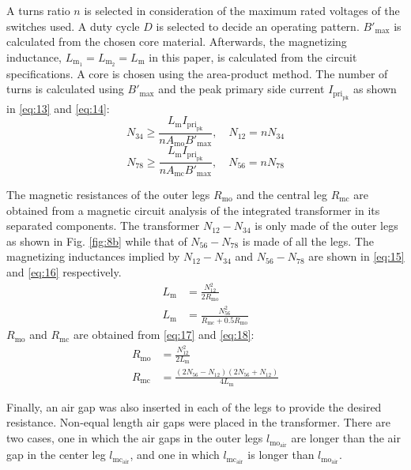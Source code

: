 \documentclass[lettersize,journal]{IEEEtran}
\begin{document}
A turns ratio $n$ is selected in consideration of the maximum rated voltages of the switches used. A duty cycle $D$ is selected to decide an operating pattern. $B'_{\mathrm{max}}$ is calculated from the chosen core material. Afterwards, the magnetizing inductance, $L_{\mathrm{m}_1}=L_{\mathrm{m}_2}=L_{\mathrm{m}}$ in this paper, is calculated from the circuit specifications. A core is chosen using the area-product method. The number of turns is calculated using $B'_{\mathrm{max}}$ and the peak primary side current $I_{\mathrm{pri}_{\mathrm{pk}}}$ as shown in \eqref{eq:13} and \eqref{eq:14}:
\begin{equation}
\label{eq:13}
N_{34} \ge \frac{L_{\mathrm{m}} I_{\mathrm{pri}_{\mathrm{pk}}}}{n A_{\mathrm{mo}} B'_{\mathrm{max}}}, \quad N_{12} = n N_{34}
\end{equation}
\begin{equation}
\label{eq:14}
N_{78} \ge \frac{L_{\mathrm{m}} I_{\mathrm{pri}_{\mathrm{pk}}}}{n A_{\mathrm{mc}} B'_{\mathrm{max}}}, \quad N_{56} = n N_{78}
\end{equation}

The magnetic resistances of the outer legs $R_{\mathrm{mo}}$ and the central leg $R_{\mathrm{mc}}$ are obtained from a magnetic circuit analysis of the integrated transformer in its separated components. The transformer $N_{12}-N_{34}$ is only made of the outer legs as shown in Fig. \ref{fig:8b} while that of $N_{56}-N_{78}$ is made of all the legs. The magnetizing inductances implied by $N_{12}-N_{34}$ and $N_{56}-N_{78}$ are shown in \eqref{eq:15} and \eqref{eq:16} respectively.
\begin{align}
L_{\mathrm{m}} &= \frac{N_{12}^2}{2 R_{\mathrm{mo}}} \label{eq:15}\\
L_{\mathrm{m}} &= \frac{N_{56}^2}{R_{\mathrm{mc}} + 0.5 R_{\mathrm{mo}}} \label{eq:16}
\end{align}
$R_{\mathrm{mo}}$ and $R_{\mathrm{mc}}$ are obtained from \eqref{eq:17} and \eqref{eq:18}:
\begin{align}
R_{\mathrm{mo}} &= \frac{N_{12}^2}{2 L_{\mathrm{m}}} \label{eq:17}\\
R_{\mathrm{mc}} &= \frac{(2 N_{56} - N_{12})(2 N_{56} + N_{12})}{4 L_{\mathrm{m}}} \label{eq:18}
\end{align}

Finally, an air gap was also inserted in each of the legs to provide the desired resistance. Non-equal length air gaps were placed in the transformer. There are two cases, one in which the air gaps in the outer legs $l_{\mathrm{mo}_{\mathrm{air}}}$ are longer than the air gap in the center leg $l_{\mathrm{mc}_{\mathrm{air}}}$, and one in which $l_{\mathrm{mc}_{\mathrm{air}}}$ is longer than $l_{\mathrm{mo}_{\mathrm{air}}}$.
\end{document}
